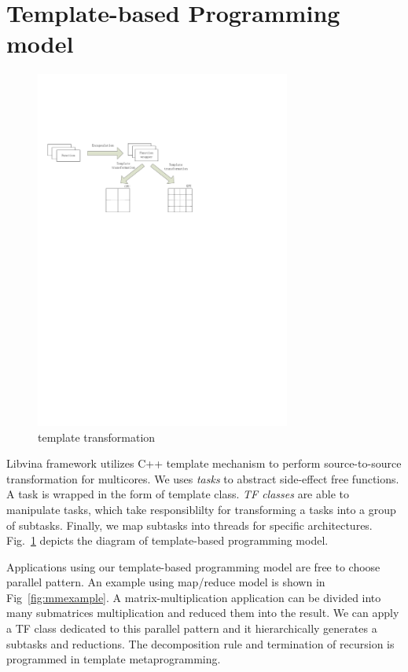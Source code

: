 \section{Template-based Programming model}

\begin{figure}[htp]
\includegraphics[width=3.3in]{../overview}
\caption{template transformation}\label{fig:overview}
\end{figure}
Libvina framework utilizes C++ template mechanism to
perform source-to-source transformation for multicores. We uses
\emph{tasks} to abstract side-effect free functions. A task is
wrapped in the form of template class. \emph{TF classes} are able to
manipulate tasks, which take responsiblilty for transforming a tasks
into a group of subtasks. Finally, we map subtasks
into threads for specific architectures. Fig.~\ref{fig:overview}
depicts the diagram of template-based programming model.

Applications using our template-based programming model are free to
choose parallel pattern. An example using map/reduce model is shown in
Fig~\ref{fig:mmexample}. A matrix-multiplication application can be divided
into many submatrices multiplication and reduced them into the
result. We can apply a TF class dedicated to this parallel pattern and
it hierarchically generates a subtasks and reductions. The decomposition rule
and termination of recursion is programmed in template
metaprogramming.  

